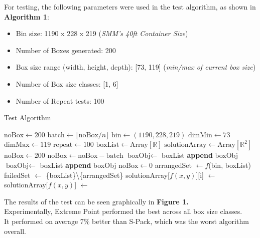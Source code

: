 \documentclass[a4paper, 11pt]{article}
\begin{document}
For testing, the following parameters were used in the test algorithm, as shown in \textbf{Algorithm 1}:
\begin{itemize}
\item Bin size: 1190 x 228 x 219 (\textit{SMM's 40ft Container Size})
\item Number of Boxes generated: 200
\item Box size range (width, height, depth): [73, 119] (\textit{min/max of current box size})
\item Number of Box size classes: [1, 6]
\item Number of Repeat tests: 100
\end{itemize}

\begin{algorithm}
\caption{Test Algorithm}
\begin{algorithmic}[1]
\State $\text{noBox}\gets200$
\State $\text{batch}\gets\lfloor\text{noBox}/n\rfloor$
\State $\text{bin}\gets(1190,228,219)$
\State $\text{dimMin}\gets73$
\State $\text{dimMax}\gets119$
\State $\text{repeat}\gets100$
\State $\text{boxList}\gets\text{Array}[\mathbb R]$
\State $\text{solutionArray}\gets\text{Array}[\mathbb R^2]$
	\State $\text{noBox}\gets200$
		\State $\text{noBox}\gets\text{noBox}-\text{batch}$
		\State $\text{boxObj}\gets$ 
			\State boxList \textbf{append} boxObj
		\EndFor
	\Else
		\State $\text{boxObj}\gets$ 
			\State boxList \textbf{append} boxObj
		\EndFor
		\State $\text{noBox}\gets0$
	\EndIf
	\EndWhile
		\State arrangedSet $\gets f$(bin, boxList)
		\State failedSet $\gets$ \{boxList\}\textbackslash\{arrangedSet\}
		\State solutionArray[$f(x,y)$][i] $\gets$ 
	\EndFor
\EndFor
{}
	\State solutionArray[$f(x,y)$] $\gets$ 
\EndFor
{}
\EndProcedure
\end{algorithmic}
\end{algorithm}

The results of the test can be seen graphically in \textbf{Figure 1.}\\

Experimentally, Extreme Point performed the best across all box size classes.\\
It performed on average 7\% better than S-Pack, which was the worst algorithm overall.
\end{document}
